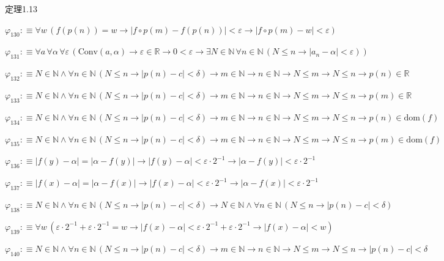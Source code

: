 \begin{fullproof}{定理1.13}
\begin{abbrevlist}
\item $\varphi_{130} :\equiv \forall w\,(f(p(n)) = w \to \lvert f \circ p(m) - f(p(n)) \rvert < \varepsilon \to \lvert f \circ p(m) - w \rvert < \varepsilon)$
\item $\varphi_{131} :\equiv \forall a\,\forall \alpha\,\forall \varepsilon\,(\mathrm{Conv}(a,\alpha) \to \varepsilon \in \mathbb{R} \to 0 < \varepsilon \to \exists N \in \mathbb{N}\,\forall n \in \mathbb{N}\,(N \leq n \to \lvert a_{n} - \alpha \rvert < \varepsilon))$
\item $\varphi_{132} :\equiv N \in \mathbb{N} \land \forall n \in \mathbb{N}\,(N \leq n \to \lvert p(n) - c \rvert < \delta) \to m \in \mathbb{N} \to n \in \mathbb{N} \to N \leq m \to N \leq n \to p(n) \in \mathbb{R}$
\item $\varphi_{133} :\equiv N \in \mathbb{N} \land \forall n \in \mathbb{N}\,(N \leq n \to \lvert p(n) - c \rvert < \delta) \to m \in \mathbb{N} \to n \in \mathbb{N} \to N \leq m \to N \leq n \to p(m) \in \mathbb{R}$
\item $\varphi_{134} :\equiv N \in \mathbb{N} \land \forall n \in \mathbb{N}\,(N \leq n \to \lvert p(n) - c \rvert < \delta) \to m \in \mathbb{N} \to n \in \mathbb{N} \to N \leq m \to N \leq n \to p(n) \in \mathrm{dom}(f)$
\item $\varphi_{135} :\equiv N \in \mathbb{N} \land \forall n \in \mathbb{N}\,(N \leq n \to \lvert p(n) - c \rvert < \delta) \to m \in \mathbb{N} \to n \in \mathbb{N} \to N \leq m \to N \leq n \to p(m) \in \mathrm{dom}(f)$
\item $\varphi_{136} :\equiv \lvert f(y) - \alpha \rvert = \lvert \alpha - f(y) \rvert \to \lvert f(y) - \alpha \rvert < \varepsilon \cdot 2^{-1} \to \lvert \alpha - f(y) \rvert < \varepsilon \cdot 2^{-1}$
\item $\varphi_{137} :\equiv \lvert f(x) - \alpha \rvert = \lvert \alpha - f(x) \rvert \to \lvert f(x) - \alpha \rvert < \varepsilon \cdot 2^{-1} \to \lvert \alpha - f(x) \rvert < \varepsilon \cdot 2^{-1}$
\item $\varphi_{138} :\equiv N \in \mathbb{N} \land \forall n \in \mathbb{N}\,(N \leq n \to \lvert p(n) - c \rvert < \delta) \to N \in \mathbb{N} \land \forall n \in \mathbb{N}\,(N \leq n \to \lvert p(n) - c \rvert < \delta)$
\item $\varphi_{139} :\equiv \forall w\,(\varepsilon \cdot 2^{-1} + \varepsilon \cdot 2^{-1} = w \to \lvert f(x) - \alpha \rvert < \varepsilon \cdot 2^{-1} + \varepsilon \cdot 2^{-1} \to \lvert f(x) - \alpha \rvert < w)$
\item $\varphi_{140} :\equiv N \in \mathbb{N} \land \forall n \in \mathbb{N}\,(N \leq n \to \lvert p(n) - c \rvert < \delta) \to m \in \mathbb{N} \to n \in \mathbb{N} \to N \leq m \to N \leq n \to \lvert p(n) - c \rvert < \delta$

\end{abbrevlist}
\end{fullproof}
